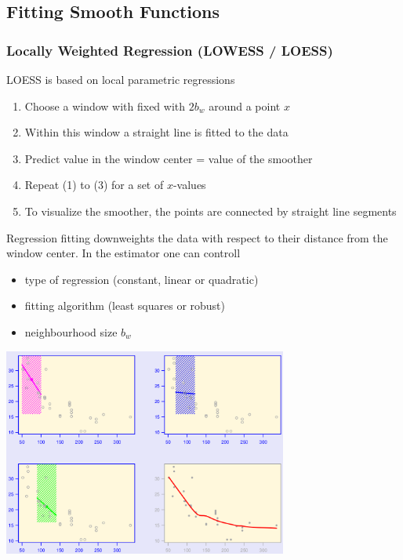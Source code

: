 \subsection{Fitting Smooth Functions}

\subsubsection{Locally Weighted Regression (LOWESS / LOESS)}
LOESS is based on local parametric regressions
\begin{enumerate}
\item Choose a window with fixed with $2b_w$ around a point $x$
\item Within this window a straight line is fitted to the data
\item Predict value in the window center = value of the smoother
\item Repeat (1) to (3) for a set of $x$-values
\item To visualize the smoother,
the points are connected by straight line segments
\end{enumerate}
Regression fitting downweights the data with respect to their distance from the
window center.
In the estimator one can controll
\begin{itemize}
\item type of regression (constant, linear or quadratic)
\item fitting algorithm (least squares or robust)
\item neighbourhood size $b_w$
\end{itemize}

\includegraphics[width=0.7\textwidth]{sections/ModelFitting/images/loess.png}

